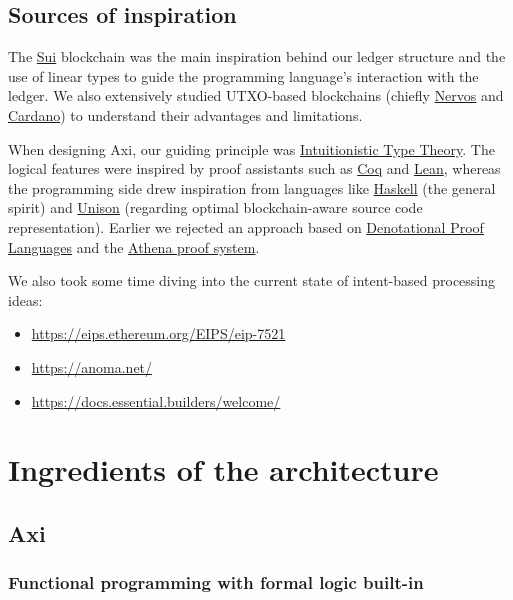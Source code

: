 \documentclass[a4paper]{article}
\begin{document}
\subsection{Sources of inspiration}

The \href{https://sui.io/}{Sui} blockchain was the main inspiration behind our ledger structure and the use of linear types to guide the programming language’s interaction with the ledger. We also extensively studied UTXO-based blockchains (chiefly \href{https://www.nervos.org/}{Nervos} and \href{https://cardano.org/}{Cardano}) to understand their advantages and limitations.

When designing Axi, our guiding principle was \href{https://en.wikipedia.org/wiki/Intuitionistic_type_theory}{Intuitionistic Type Theory}. The logical features were inspired by proof assistants such as \href{https://rocq-prover.org/}{Coq} and \href{https://lean-lang.org/}{Lean}, whereas the programming side drew inspiration from languages like \href{https://www.haskell.org/}{Haskell} (the general spirit) and \href{https://www.unison-lang.org/}{Unison} (regarding optimal blockchain-aware source code representation). Earlier we rejected an approach based on \href{https://people.csail.mit.edu/kostas/dpls/dpl-dissertation.pdf}{Denotational Proof Languages} and the \href{https://athena-lang.org/learn}{Athena proof system}.

We also took some time diving into the current state of intent-based processing ideas:

\begin{itemize}
  \item \url{https://eips.ethereum.org/EIPS/eip-7521}
  \item \url{https://anoma.net/}
  \item \url{https://docs.essential.builders/welcome/}
\end{itemize}

\section{Ingredients of the architecture}

\subsection{Axi}

\subsubsection{Functional programming with formal logic built-in}
\end{document}
